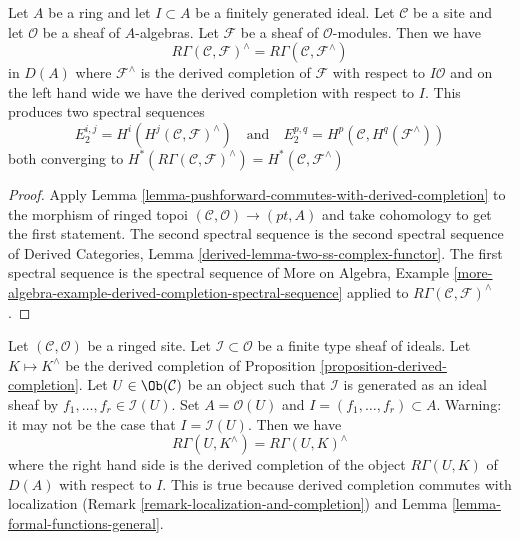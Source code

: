 \begin{lemma}
\label{lemma-formal-functions-general}
Let $A$ be a ring and let $I \subset A$ be a finitely generated ideal.
Let $\mathcal{C}$ be a site and let $\mathcal{O}$ be a sheaf
of $A$-algebras. Let $\mathcal{F}$ be a sheaf of $\mathcal{O}$-modules.
Then we have
$$
R\Gamma(\mathcal{C}, \mathcal{F})^\wedge =
R\Gamma(\mathcal{C}, \mathcal{F}^\wedge)
$$
in $D(A)$ where $\mathcal{F}^\wedge$ is the derived
completion of $\mathcal{F}$ with respect to $I\mathcal{O}$ and on the
left hand wide we have the derived completion with respect to $I$.
This produces two spectral sequences
$$
E_2^{i, j} = H^i(H^j(\mathcal{C}, \mathcal{F})^\wedge)
\quad\text{and}\quad
E_2^{p, q} = H^p(\mathcal{C}, H^q(\mathcal{F}^\wedge))
$$
both converging to
$H^*(R\Gamma(\mathcal{C}, \mathcal{F})^\wedge) =
H^*(\mathcal{C}, \mathcal{F}^\wedge)$
\end{lemma}

\begin{proof}
Apply Lemma \ref{lemma-pushforward-commutes-with-derived-completion}
to the morphism of ringed topoi $(\mathcal{C}, \mathcal{O}) \to (pt, A)$
and take cohomology to get the first statement. The second spectral sequence
is the second spectral sequence of
Derived Categories, Lemma \ref{derived-lemma-two-ss-complex-functor}.
The first spectral sequence is the spectral sequence of
More on Algebra, Example
\ref{more-algebra-example-derived-completion-spectral-sequence}
applied to $R\Gamma(\mathcal{C}, \mathcal{F})^\wedge$.
\end{proof}

\begin{remark}
\label{remark-local-calculation-derived-completion}
Let $(\mathcal{C}, \mathcal{O})$ be a ringed site.
Let $\mathcal{I} \subset \mathcal{O}$ be a finite type sheaf of
ideals. Let $K \mapsto K^\wedge$ be the derived completion of
Proposition \ref{proposition-derived-completion}.
Let $U \in \Ob(\mathcal{C})$ be an object such that $\mathcal{I}$
is generated as an ideal sheaf by $f_1, \ldots, f_r \in \mathcal{I}(U)$.
Set $A = \mathcal{O}(U)$ and $I = (f_1, \ldots, f_r) \subset A$.
Warning: it may not be the case that $I = \mathcal{I}(U)$.
Then we have
$$
R\Gamma(U, K^\wedge) = R\Gamma(U, K)^\wedge
$$
where the right hand side is the derived completion of
the object $R\Gamma(U, K)$ of $D(A)$ with respect to $I$.
This is true because derived completion commutes with localization
(Remark \ref{remark-localization-and-completion}) and
Lemma \ref{lemma-formal-functions-general}.
\end{remark}








